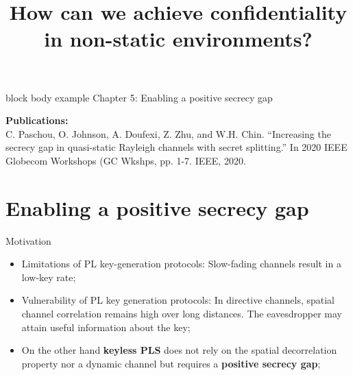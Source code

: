 \section*{}
\begin{frame}{}
\begin{beamercolorbox}[colsep=1.5pt,rounded=true,shadow=true]{block body example}
    \huge{Chapter 5: Enabling a positive secrecy gap}
\end{beamercolorbox}
\vspace{2cm}
\textbf{Publications:}\\
 C. Paschou, O. Johnson, A. Doufexi, Z. Zhu, and W.H. Chin. ``Increasing the secrecy gap in quasi-static Rayleigh channels with secret splitting.'' In 2020 IEEE Globecom Workshops (GC Wkshps, pp. 1-7. IEEE, 2020.

\end{frame}

\section{Enabling a positive secrecy gap}


\begin{frame}{Motivation}
\title{How can we achieve confidentiality in non-static environments?}

\begin{itemize}
    \item Limitations of PL key-generation protocols: Slow-fading channels result in a low-key rate;

\item Vulnerability of PL key generation protocols: In directive channels, spatial channel correlation remains high over long distances. The eavesdropper may attain useful information about the key;

\item On the other hand \textbf{keyless PLS} does not rely on the spatial decorrelation property nor a dynamic channel but requires a \textbf{positive secrecy gap};

\end{itemize}
\end{frame}


